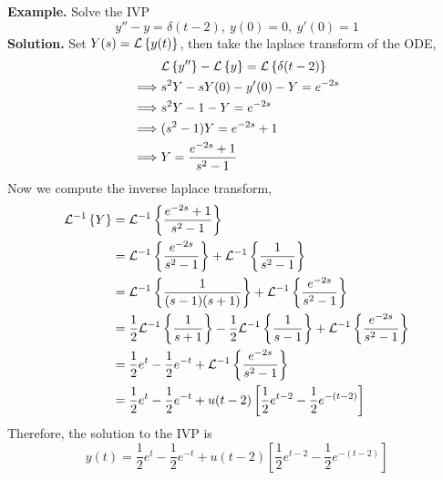 \documentclass[openany]{report}
\begin{document}
\noindent
\textbf{Example.} Solve the IVP 
\[y'' - y = \delta(t-2), \ y(0) = 0, \ y'(0) = 1\]
\noindent
\textbf{Solution.} Set $Y(s) = \mathcal{L}\left\{y(t)\right\}$, then take the laplace transform of the ODE, 
\begin{align*}
    &\mathcal{L}\left\{y''\right\} - \mathcal{L}\left\{y\right\} = \mathcal{L}\left\{\delta(t-2)\right\}\\
    \implies& s^2Y - sY(0) - y'(0) - Y = e^{-2s}\\
    \implies& s^2Y - 1 - Y = e^{-2s}\\
    \implies& (s^2 - 1)Y = e^{-2s} + 1\\
    \implies& Y = \frac{e^{-2s} + 1}{s^2-1}
\end{align*}
Now we compute the inverse laplace transform, 
\begin{align*}
    \mathcal{L}^{-1}\left\{Y\right\} &= \mathcal{L}^{-1}\left\{\frac{e^{-2s} + 1}{s^2 - 1}\right\}\\
    &= \mathcal{L}^{-1}\left\{\frac{e^{-2s}}{s^2-1}\right\} + \mathcal{L}^{-1}\left\{\frac{1}{s^2-1}\right\}\\
    &= \mathcal{L}^{-1}\left\{\frac{1}{(s-1)(s+1)}\right\} + \mathcal{L}^{-1}\left\{\frac{e^{-2s}}{s^2-1}\right\}\\
    &= \frac{1}{2}\mathcal{L}^{-1}\left\{\frac{1}{s+1}\right\} - \frac{1}{2}\mathcal{L}^{-1}\left\{\frac{1}{s-1}\right\} + \mathcal{L}^{-1}\left\{\frac{e^{-2s}}{s^2-1}\right\}\\
    &= \frac{1}{2}e^t - \frac{1}{2}e^{-t} + \mathcal{L}^{-1}\left\{\frac{e^{-2s}}{s^2-1}\right\}\\
    &= \frac{1}{2}e^{t} - \frac{1}{2}e^{-t} + u(t-2)\left[\frac{1}{2}e^{t-2} - \frac{1}{2}e^{-(t-2)}\right]\\
\end{align*}
Therefore, the solution to the IVP is 
\[y(t) = \frac{1}{2}e^{t} - \frac{1}{2}e^{-t} + u(t-2)\left[\frac{1}{2}e^{t-2} - \frac{1}{2}e^{-(t-2)}\right]\]
\end{document}
